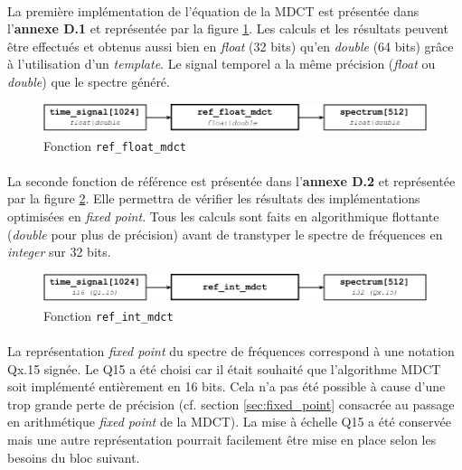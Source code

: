 \documentclass{article}
\begin{document}
    \paragraph{}
    La première implémentation de l'équation de la MDCT est présentée dans l'\textbf{annexe D.1} et représentée par la figure \ref{fig:func_ref_float_mdct}. Les calculs et les résultats peuvent être effectués et obtenus aussi bien en \emph{float} (32 bits) qu'en \emph{double} (64 bits) grâce à l'utilisation d'un \emph{template}. Le signal temporel a la même précision (\emph{float} ou \emph{double}) que le spectre généré.
    \begin{figure}[H]
        \centering
        \includegraphics[width=.8\linewidth]{./images/func_ref_float_mdct.pdf}
        \caption{Fonction \texttt{ref\_float\_mdct}}
        \label{fig:func_ref_float_mdct}
    \end{figure}

    \paragraph{}
    La seconde fonction de référence est présentée dans l'\textbf{annexe D.2} et représentée par la figure \ref{fig:func_ref_int_mdct}. Elle permettra de vérifier les résultats des implémentations optimisées en \emph{fixed point}. Tous les calculs sont faits en algorithmique flottante (\emph{double} pour plus de précision) avant de transtyper le spectre de fréquences en \emph{integer} sur 32 bits.
    \begin{figure}[H]
        \centering
        \includegraphics[width=.8\linewidth]{./images/func_ref_int_mdct.pdf}
        \caption{Fonction \texttt{ref\_int\_mdct}}
        \label{fig:func_ref_int_mdct}
    \end{figure}
    
    \paragraph{}
    La représentation \emph{fixed point} du spectre de fréquences correspond à une notation Qx.15 signée. Le Q15 a été choisi car il était souhaité que l'algorithme MDCT soit implémenté entièrement en 16 bits. Cela n'a pas été possible à cause d'une trop grande perte de précision (cf. section \ref{sec:fixed_point} consacrée au passage en arithmétique \emph{fixed point} de la MDCT). La mise à échelle Q15 a été conservée mais une autre représentation pourrait facilement être mise en place selon les besoins du bloc suivant.
\end{document}
